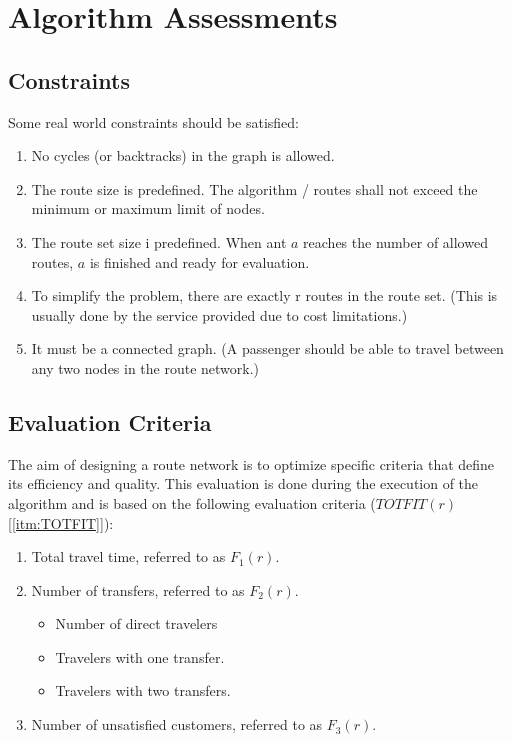 \section{Algorithm Assessments}

\subsection{Constraints}
Some real world constraints should be satisfied:
\begin{enumerate}
\item \label{itm:constraintCycles} No cycles (or backtracks) in the graph is allowed.
\item \label{itm:constraintRouteSize} The route size is predefined. The algorithm / routes shall not exceed the minimum or maximum limit of nodes.
\item \label{itm:constraintRouteSetSize} The route set size i predefined. When ant $a$ reaches the number of allowed routes, $a$ is finished and ready for evaluation. 
\item \label{itm:constraintRouteSet} To simplify the problem, there are exactly r routes in the route set. (This is usually done by the service provided due to cost limitations.)
\item \label{itm:criteriaConnectedGraph} It must be a connected graph. (A passenger should be able to travel between any two nodes in the route network.) 
\end{enumerate}

\subsection{Evaluation Criteria} 
The aim of designing a route network is to optimize specific criteria that define its efficiency and quality. This evaluation is done during the execution of the algorithm and is based on the following evaluation criteria ($TOTFIT(r)$ [\ref{itm:TOTFIT}]):
\begin{enumerate}
\item \label{itm:criteriaTotalTravelTime} Total travel time, referred to as $F_1(r)$.
\item \label{itm:f2} Number of transfers, referred to as $F_2(r)$.
\begin{itemize}
\item Number of direct travelers
\item Travelers with one transfer.
\item Travelers with two transfers.
\end{itemize}
\item \label{itm:TODO} Number of unsatisfied customers, referred to as $F_3(r)$. 
\end{enumerate}



